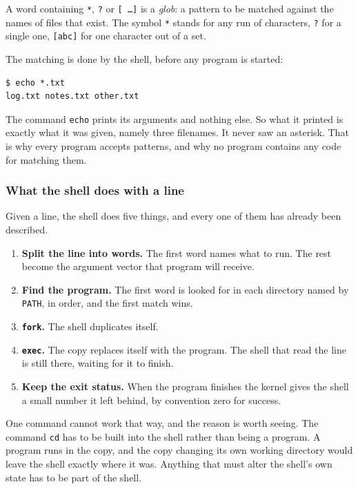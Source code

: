\documentclass[11pt,a4paper]{article}
\begin{document}
A word containing \texttt{*}, \texttt{?} or \texttt{[\,\ldots]} is a \emph{glob}: a pattern to
be matched against the names of files that exist. The symbol \texttt{*} stands for any run of characters,
\texttt{?} for a single one, \texttt{[abc]} for one character out of a set.

The matching is done by the shell, before any program is started:

\begin{lstlisting}[language=SH]
$ echo *.txt
log.txt notes.txt other.txt
\end{lstlisting}

The command \texttt{echo} prints its arguments and nothing else. So what it printed is exactly what it was
given, namely three filenames. It never saw an asterisk. That is why every program accepts
patterns, and why no program contains any code for matching them.

\subsubsection{What the shell does with a line}

Given a line, the shell does five things, and every one of them has already been described.

\begin{enumerate}
\item \textbf{Split the line into words.} The first word names what to run. The rest become the
      argument vector that program will receive.
\item \textbf{Find the program.} The first word is looked for in each directory named by
      \texttt{PATH}, in order, and the first match wins.
\item \textbf{\texttt{fork}.} The shell duplicates itself.
\item \textbf{\texttt{exec}.} The copy replaces itself with the program. The shell that read
      the line is still there, waiting for it to finish.
\item \textbf{Keep the exit status.} When the program finishes the kernel gives the shell a
      small number it left behind, by convention zero for success.
\end{enumerate}

One command cannot work that way, and the reason is worth seeing. The command \texttt{cd} has to be built
into the shell rather than being a program. A program runs in the copy, and the copy changing its
own working directory would leave the shell exactly where it was. Anything that must alter the
shell's own state has to be part of the shell.
\end{document}
